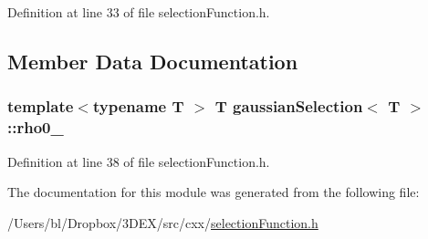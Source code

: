 Definition at line 33 of file selectionFunction.h.



\subsection{Member Data Documentation}
\hypertarget{modulegaussian_selection_a10af7fb60964cb7b0e1b228df82e6d4b}{
\subsubsection[{rho0\_\-}]{\setlength{\rightskip}{0pt plus 5cm}template$<$typename T $>$ T {\bf gaussianSelection}$<$ T $>$::{\bf rho0\_\-}}}
\label{modulegaussian_selection_a10af7fb60964cb7b0e1b228df82e6d4b}


Definition at line 38 of file selectionFunction.h.



The documentation for this module was generated from the following file:\begin{DoxyCompactItemize}
\item 
/Users/bl/Dropbox/3DEX/src/cxx/\hyperlink{selection_function_8h}{selectionFunction.h}\end{DoxyCompactItemize}
